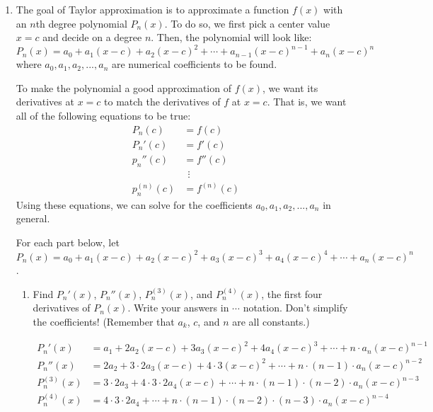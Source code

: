 \documentclass[main]{subfiles}
\begin{document}
\begin{enumerate}


  \item 
 The goal of Taylor approximation is to approximate a function $f(x)$ with an $n$th degree polynomial $P_n(x)$. To do so, we first pick a center value $x=c$ and decide on a degree $n$. Then, the polynomial will look like:
  $$\boxed{P_n(x)=a_0+a_1(x-c)+a_2(x-c)^2+ \cdots + a_{n-1}(x-c)^{n-1}+a_n(x-c)^n}$$
  where $a_0, a_1, a_2, ..., a_n$ are numerical coefficients to be found.
  
  To make the polynomial a good approximation of $f(x)$, we want its derivatives at $x=c$ to match the derivatives of $f$ at $x=c$. That is, we want all of the following equations to be true:
  \begin{align*}
  P_n(c) &= f(c)\\
  P_n'(c) &= f'(c)\\
  p_n''(c) &= f''(c)\\
  &~~\vdots \\
  p_n^{(n)}(c)&=f^{(n)}(c)
  \end{align*}
  Using these equations, we can solve for the coefficients $a_0, a_1, a_2, ..., a_n$ in general. 
  
For each part below, let $P_n(x)=a_0+a_1(x-c)+a_2(x-c)^2+ a_3(x-c)^3+a_4(x-c)^4+\cdots +a_n(x-c)^n$.
  
 \begin{enumerate}
 \item 
 \begin{problem}[\vfill]
 Find $P_n'(x)$, $P_n''(x)$, $P_n^{(3)}(x)$, and $P_n^{(4)}(x)$, the first four derivatives of $P_n(x)$. Write your answers in $\cdots$ notation. Don't simplify the coefficients! (Remember that $a_k$, $c$, and $n$ are all constants.)
 \end{problem}
 
 
 \begin{solution}
 \begin{align*}
 P_n'(x) &=a_1 + 2a_2(x-c)+3a_3(x-c)^2+4a_4(x-c)^3+\cdots + n\cdot a_n(x-c)^{n-1}\\
 P_n''(x) &= 2a_2 + 3\cdot 2a_3(x-c)+4\cdot 3(x-c)^2+\cdots + n\cdot (n-1) \cdot a_n(x-c)^{n-2}\\
P_n^{(3)}(x) &= 3\cdot 2a_3+4\cdot 3\cdot 2a_4(x-c)+\cdots + n\cdot (n-1) \cdot (n-2)\cdot a_n(x-c)^{n-3}\\
P_n^{(4)}(x) &= 4\cdot 3\cdot 2a_4+\cdots + n\cdot (n-1) \cdot (n-2)\cdot (n-3)\cdot a_n(x-c)^{n-4}
 \end{align*}
 \end{solution}
 

\end{enumerate}
\end{enumerate}
\end{document}
